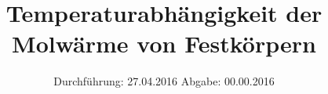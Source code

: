 


\subject{Versuchsprotokoll}
\title{Temperaturabhängigkeit der Molwärme von Festkörpern}
\date{
  Durchführung: 27.04.2016
  \hspace{3em}
  Abgabe: 00.00.2016
}




\maketitle
\thispagestyle{empty}







\printbibliography


